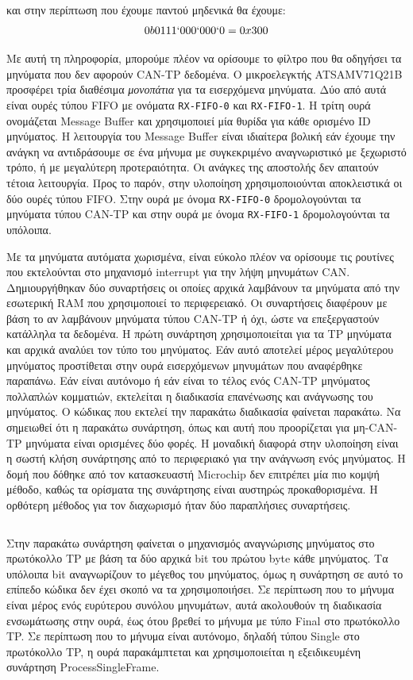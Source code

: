 \documentclass[a4paper,nobib,justified]{tufte-book}
\begin{document}
και στην περίπτωση που έχουμε παντού μηδενικά θα έχουμε:
\begin{equation}
0b0111`000`000`0 = 0x300
\end{equation}

Με αυτή τη πληροφορία, μπορούμε πλέον να ορίσουμε το φίλτρο που θα οδηγήσει τα μηνύματα που δεν αφορούν CAN-TP δεδομένα. Ο μικροελεγκτής ATSAMV71Q21B προσφέρει τρία διαθέσιμα \textit{μονοπάτια} για τα εισερχόμενα μηνύματα. Δύο από αυτά είναι ουρές τύπου FIFO με ονόματα \texttt{RX-FIFO-0} και \texttt{RX-FIFO-1}. Η τρίτη ουρά ονομάζεται Message Buffer και χρησιμοποιεί μία θυρίδα για κάθε ορισμένο ID μηνύματος. Η λειτουργία του Message Buffer είναι ιδιαίτερα βολική εάν έχουμε την ανάγκη να αντιδράσουμε σε ένα μήνυμα με συγκεκριμένο αναγνωριστικό με ξεχωριστό τρόπο, ή με μεγαλύτερη προτεραιότητα. Οι ανάγκες της αποστολής δεν απαιτούν τέτοια λειτουργία. Προς το παρόν, στην υλοποίηση χρησιμοποιούνται αποκλειστικά οι δύο ουρές τύπου FIFO. Στην ουρά με όνομα \texttt{RX-FIFO-0} δρομολογούνται τα μηνύματα τύπου CAN-TP και στην ουρά με όνομα \texttt{RX-FIFO-1} δρομολογούνται τα υπόλοιπα.

Με τα μηνύματα αυτόματα χωρισμένα, είναι εύκολο πλέον να ορίσουμε τις ρουτίνες που εκτελούνται στο μηχανισμό interrupt για την λήψη μηνυμάτων CAN. Δημιουργήθηκαν δύο συναρτήσεις οι οποίες αρχικά λαμβάνουν τα μηνύματα από την εσωτερική RAM που χρησιμοποιεί το περιφερειακό. Οι συναρτήσεις διαφέρουν με βάση το αν λαμβάνουν μηνύματα τύπου CAN-TP ή όχι, ώστε να επεξεργαστούν κατάλληλα τα δεδομένα. Η πρώτη συνάρτηση χρησιμοποιείται για τα TP μηνύματα και αρχικά αναλύει τον τύπο του μηνύματος. Εάν αυτό αποτελεί μέρος μεγαλύτερου μηνύματος προστίθεται στην ουρά εισερχόμενων μηνυμάτων που αναφέρθηκε παραπάνω. Εάν είναι αυτόνομο ή εάν είναι το τέλος ενός CAN-TP μηνύματος πολλαπλών κομματιών, εκτελείται η διαδικασία επανένωσης και ανάγνωσης του μηνύματος. Ο κώδικας που εκτελεί την παρακάτω διαδικασία φαίνεται παρακάτω. Να σημειωθεί ότι η παρακάτω συνάρτηση, όπως και αυτή που προορίζεται για μη-CAN-TP μηνύματα είναι ορισμένες δύο φορές. Η μοναδική διαφορά στην υλοποίηση είναι η σωστή κλήση συνάρτησης από το περιφεριακό για την ανάγνωση ενός μηνύματος. Η δομή που δόθηκε από τον κατασκευαστή Microchip δεν επιτρέπει μία πιο κομψή μέθοδο, καθώς τα ορίσματα της συνάρτησης είναι αυστηρώς προκαθορισμένα. Η ορθότερη μέθοδος για τον διαχωρισμό ήταν δύο παραπλήσιες συναρτήσεις.
\inputminted{c++}{code/examples/driver-tp-message-receiver.cpp}

Στην παρακάτω συνάρτηση φαίνεται ο μηχανισμός αναγνώρισης μηνύματος στο πρωτόκολλο TP με βάση τα δύο αρχικά bit του πρώτου byte κάθε μηνύματος. Τα υπόλοιπα bit αναγνωρίζουν το μέγεθος του μηνύματος, όμως η συνάρτηση σε αυτό το επίπεδο κώδικα δεν έχει σκοπό να τα χρησιμοποιήσει. Σε περίπτωση που το μήνυμα είναι μέρος ενός ευρύτερου συνόλου μηνυμάτων, αυτά ακολουθούν τη διαδικασία ενσωμάτωσης στην ουρά, έως ότου βρεθεί το μήνυμα με τύπο Final στο πρωτόκολλο TP. Σε περίπτωση που το μήνυμα είναι αυτόνομο, δηλαδή τύπου Single στο πρωτόκολλο TP, η ουρά παρακάμπτεται και χρησιμοποιείται η εξειδικευμένη συνάρτηση ProcessSingleFrame\(\).
\end{document}
